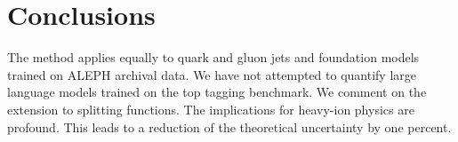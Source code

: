 \section{Conclusions}\label{sec:conclusions}

The method applies equally to quark and gluon jets and foundation models
trained on ALEPH archival data. We have not attempted to quantify large
language models trained on the top tagging benchmark. We comment on the
extension to splitting functions. The implications for heavy-ion physics
are profound. This leads to a reduction of the theoretical uncertainty
by one percent.

